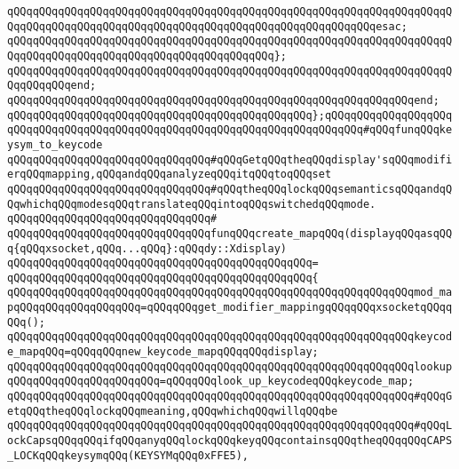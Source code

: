 \verb|qQQqqQQqqQQqqQQqqQQqqQQqqQQqqQQqqQQqqQQqqQQqqQQqqQQqqQQqqQQqqQQqqQQqqQQqqQQqqQQqqQQqqQQqqQQqqQQqqQQqqQQqqQQqqQQqqQQqqQQqqQQqqQQqesac;|\newline
\verb|qQQqqQQqqQQqqQQqqQQqqQQqqQQqqQQqqQQqqQQqqQQqqQQqqQQqqQQqqQQqqQQqqQQqqQQqqQQqqQQqqQQqqQQqqQQqqQQqqQQqqQQqqQQqqQQq};|\newline
\verb|qQQqqQQqqQQqqQQqqQQqqQQqqQQqqQQqqQQqqQQqqQQqqQQqqQQqqQQqqQQqqQQqqQQqqQQqqQQqqQQqend;|\newline
\verb|qQQqqQQqqQQqqQQqqQQqqQQqqQQqqQQqqQQqqQQqqQQqqQQqqQQqqQQqqQQqqQQqend;|\newline
\verb|qQQqqQQqqQQqqQQqqQQqqQQqqQQqqQQqqQQqqQQqqQQqqQQq};qQQqqQQqqQQqqQQqqQQqqQQqqQQqqQQqqQQqqQQqqQQqqQQqqQQqqQQqqQQqqQQqqQQqqQQqqQQq#qQQqfunqQQqkeysym_to_keycode|\newline
\newline
\newline
\verb|qQQqqQQqqQQqqQQqqQQqqQQqqQQqqQQq#qQQqGetqQQqtheqQQqdisplay'sqQQqmodifierqQQqmapping,qQQqandqQQqanalyzeqQQqitqQQqtoqQQqset|\newline
\verb|qQQqqQQqqQQqqQQqqQQqqQQqqQQqqQQq#qQQqtheqQQqlockqQQqsemanticsqQQqandqQQqwhichqQQqmodesqQQqtranslateqQQqintoqQQqswitchedqQQqmode.|\newline
\verb|qQQqqQQqqQQqqQQqqQQqqQQqqQQqqQQq#|\newline
\verb|qQQqqQQqqQQqqQQqqQQqqQQqqQQqqQQqfunqQQqcreate_mapqQQq(displayqQQqasqQQq{qQQqxsocket,qQQq...qQQq}:qQQqdy::Xdisplay)|\newline
\verb|qQQqqQQqqQQqqQQqqQQqqQQqqQQqqQQqqQQqqQQqqQQqqQQq=|\newline
\verb|qQQqqQQqqQQqqQQqqQQqqQQqqQQqqQQqqQQqqQQqqQQqqQQq{|\newline
\verb|qQQqqQQqqQQqqQQqqQQqqQQqqQQqqQQqqQQqqQQqqQQqqQQqqQQqqQQqqQQqqQQqmod_mapqQQqqQQqqQQqqQQqqQQq=qQQqqQQqget_modifier_mappingqQQqqQQqxsocketqQQqqQQq();|\newline
\verb|qQQqqQQqqQQqqQQqqQQqqQQqqQQqqQQqqQQqqQQqqQQqqQQqqQQqqQQqqQQqqQQqkeycode_mapqQQq=qQQqqQQqnew_keycode_mapqQQqqQQqdisplay;|\newline
\verb|qQQqqQQqqQQqqQQqqQQqqQQqqQQqqQQqqQQqqQQqqQQqqQQqqQQqqQQqqQQqqQQqlookupqQQqqQQqqQQqqQQqqQQqqQQq=qQQqqQQqlook_up_keycodeqQQqkeycode_map;|\newline
\newline
\verb|qQQqqQQqqQQqqQQqqQQqqQQqqQQqqQQqqQQqqQQqqQQqqQQqqQQqqQQqqQQqqQQq#qQQqGetqQQqtheqQQqlockqQQqmeaning,qQQqwhichqQQqwillqQQqbe|\newline
\verb|qQQqqQQqqQQqqQQqqQQqqQQqqQQqqQQqqQQqqQQqqQQqqQQqqQQqqQQqqQQqqQQq#qQQqLockCapsqQQqqQQqifqQQqanyqQQqlockqQQqkeyqQQqcontainsqQQqtheqQQqqQQqCAPS_LOCKqQQqkeysymqQQq(KEYSYMqQQq0xFFE5),|\newline
